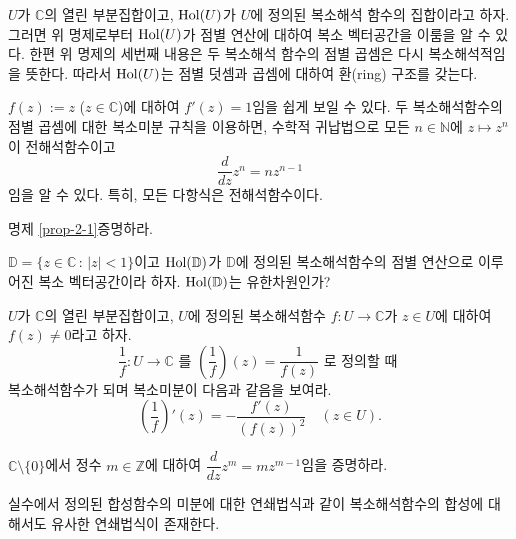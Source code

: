 \begin{salt_remark}\label{remark-2-1}
$U$가 $\mathbb C$의 열린 부분집합이고,
$\mathop{\mathrm{Hol}}(U)$가 $U$에 정의된 복소해석 함수의 집합이라고 하자.
그러면 위 명제로부터 $\mathop{\mathrm{Hol}}(U)$가 점별 연산에 대하여 복소 벡터공간을 이룸을 알 수 있다.
한편 위 명제의 세번째 내용은 두 복소해석 함수의 점별 곱셈은 다시 복소해석적임을 뜻한다.
따라서 $\mathop{\mathrm{Hol}}(U)$는 점별 덧셈과 곱셈에 대하여
환(ring) 구조를 갖는다.
\end{salt_remark}

\begin{saltexample}[label=example-2-3]{}{}
$f(z):=z$ ($z\in \mathbb C$)에 대하여 $f'(z)=1$임을 쉽게 보일 수 있다.
두 복소해석함수의 점별 곱셈에 대한 복소미분 규칙을 이용하면,
수학적 귀납법으로 모든 $n\in \mathbb N$에 $z\mapsto z^n$이 전해석함수이고
\[
\dfrac{d}{dz} z^n = nz^{n-1}
\]
임을 알 수 있다.
특히, 모든 다항식은 전해석함수이다.
\end{saltexample}

\begin{salt_exercise} \label{ex-2-4}
명제 \ref{prop-2-1}\을 증명하라.
\end{salt_exercise}


\begin{salt_exercise} \label{ex-2-5}
$\mathbb D = \{ z\in\mathbb C \,:\, |z|<1 \}$이고
$\mathop{\mathrm{Hol}}(\mathbb D)$가 $\mathbb D$에 정의된 복소해석함수의 점별 연산으로 이루어진
복소 벡터공간이라 하자.  $\mathop{\mathrm{Hol}}(\mathbb D)$는 유한차원인가?
\end{salt_exercise}


\begin{salt_exercise} \label{ex-2-6}
$U$가 $\mathbb C$의 열린 부분집합이고,
$U$에 정의된 복소해석함수 $f:U\to \mathbb C$가 
$z\in U$에 대하여 $f(z)\ne 0$라고 하자.
\[
\dfrac 1f : U \to \mathbb C \text{ 를 }
\left( \dfrac 1f \right) (z) = \dfrac 1{f(z)} \text{ 로 정의할 때 }
\]
복소해석함수가 되며 복소미분이 다음과 같음을 보여라.
\[
\left( \dfrac 1f \right)' (z) = - \dfrac{f'(z)}{(f(z))^2} \quad (z\in U).
\]
\end{salt_exercise}

\begin{salt_exercise} \label{ex-2-7}
$\mathbb C\setminus \{0\}$에서 정수 $m\in\mathbb Z$에 대하여
$\dfrac d{dz} z^m = mz^{m-1}$임을 증명하라.
\end{salt_exercise}

실수에서 정의된 합성함수의 미분에 대한 연쇄법식과 같이
복소해석함수의 합성에 대해서도 유사한 연쇄법식이 존재한다.

